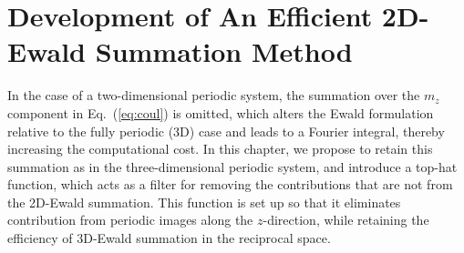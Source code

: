 
\chapter{Development of An Efficient 2D-Ewald Summation Method}

\label{Chapter3}

In the case of a two-dimensional periodic system, the summation over the $m_z$ component in Eq.~(\ref{eq:coul}) is omitted, which alters the Ewald formulation relative to the fully periodic (3D) case and leads to a Fourier integral, thereby increasing the computational cost. In this chapter, we propose to retain this summation as in the three-dimensional periodic system, and introduce a top-hat function, which acts as a filter for removing the contributions that are not from the 2D-Ewald summation. This function is set up so that it eliminates contribution from periodic images along the $z$-direction, while retaining the efficiency of 3D-Ewald summation in the reciprocal space. 
 
